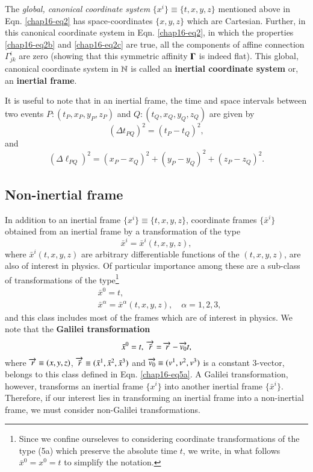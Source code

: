 The \textsl{global, canonical coordinate system} $\{x^i\}\equiv\{t, x,y,z\} $ mentioned above in Eqn. \eqref{chap16-eq2} has space-coordinates $\{x,y,z\}$ which are Cartesian. Further, in this canonical coordinate system in Eqn. \eqref{chap16-eq2}, in which the properties \eqref{chap16-eq2b} and \eqref{chap16-eq2c} are true, all the components of affine connection $\Gamma^i_{jk}$ are zero (showing that this  symmetric affinity $\mathbf{\Gamma}$ is indeed flat). This global, canonical coordinate system in $\mathbb{N}$ is called an \textbf{inertial coordinate system} or, an \textbf{inertial frame}. 

It is useful to note that in an inertial frame, the time and space intervals between two events $P:(t_P,x_P,y_P,z_P)$ and $Q:(t_Q,x_Q,y_Q,z_Q)$  are given by
\begin{equation}
(\Delta  t_{PQ})^2=(t_P-t_Q)^2,\label{chap16-eq3}
\end{equation}
and 
\begin{equation}
(\Delta  \ell_{PQ})^2=(x_P-x_Q)^2+(y_P-y_Q)^2+(z_P-z_Q)^2.\label{chap16-eq4}
\end{equation}

\subsection{Non-inertial frame}\label{chap16-sec2.2}

In addition to an inertial frame $\{x^i\}\equiv\{t,x,y,z\}$, coordinate frames  $\{\bar{x}^i\}$ obtained from an inertial frame by a transformation of the type 
\begin{equation}
\bar{x}^i=\bar{x}^i(t, x,y,z),\label{chap16-eq5}
\end{equation}
where $\bar{x}^i (t, x,y,z)$ are arbitrary differentiable functions of the $(t, x,y,z)$,  are also of interest in physics. Of particular importance among these are a sub-class of transformations of the type\footnote{Since we confine ourseleves to considering coordinate transformations of the type (5a) which preserve the absolute time $t$, we write, in what follows $\bar{x}^0=x^0=t$ to simplify the notation.} 
\begin{align*}
& \bar{x}^0= t,\\
& \bar{x}^\alpha=\bar{x}^\alpha(t, x,y,z),\quad \alpha=1,2,3,\tag{5a}\label{chap16-eq5a}
\end{align*}
and this class includes most of the  frames which are of interest in physics. We note that the \textbf{Galilei transformation} 
\begin{equation}
 \bar{x}^0=t,\;\overrightarrow{\bar{r}} =\overrightarrow{r}-\overrightarrow{v_0}t ,\label{chap16-eq6}
\end{equation}
where $\overrightarrow{{r}}\equiv  (x,y,z)$, $\overrightarrow{\bar{r}}\equiv  (\bar{x}^1,\bar{x}^2,\bar{x}^3)$ and $\overrightarrow{v_0}\equiv  (v^1,v^2,v^3)$ is a constant 3-vector, belongs to this class defined in Eqn. \eqref{chap16-eq5a}. A Galilei transformation, however,  transforms an  inertial frame $\{x^i\}$ into another inertial frame $\{\bar{x}^i\}$. Therefore, if our interest lies in transforming an inertial frame into a non-inertial frame, we must consider non-Galilei transformations. 


